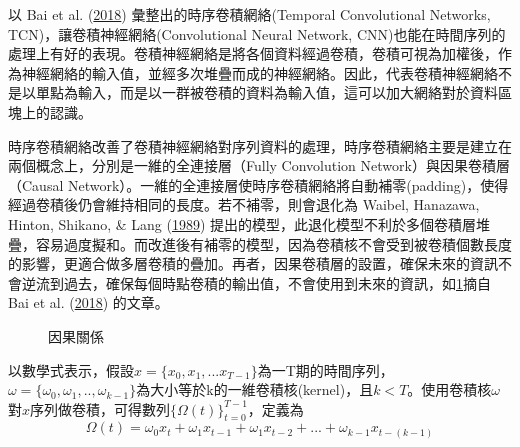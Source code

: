 \documentclass[oneside]{book}
\begin{document}
以 Bai et al. (\protect\hyperlink{ref-baiEmpiricalEvaluationGeneric2018}{2018}) 彙整出的時序卷積網絡(Temporal Convolutional Networks, TCN)，讓卷積神經網絡(Convolutional Neural Network, CNN)也能在時間序列的處理上有好的表現。卷積神經網絡是將各個資料經過卷積，卷積可視為加權後，作為神經網絡的輸入值，並經多次堆疊而成的神經網絡。因此，代表卷積神經網絡不是以單點為輸入，而是以一群被卷積的資料為輸入值，這可以加大網絡對於資料區塊上的認識。

時序卷積網絡改善了卷積神經網絡對序列資料的處理，時序卷積網絡主要是建立在兩個概念上，分別是一維的全連接層（Fully Convolution Network）與因果卷積層（Causal Network）。一維的全連接層使時序卷積網絡將自動補零(padding)，使得經過卷積後仍會維持相同的長度。若不補零，則會退化為 Waibel, Hanazawa, Hinton, Shikano, \& Lang (\protect\hyperlink{ref-waibelPhonemeRecognitionUsing1989}{1989}) 提出的模型，此退化模型不利於多個卷積層堆疊，容易過度擬和。而改進後有補零的模型，因為卷積核不會受到被卷積個數長度的影響，更適合做多層卷積的疊加。再者，因果卷積層的設置，確保未來的資訊不會逆流到過去，確保每個時點卷積的輸出值，不會使用到未來的資訊，如\ref{fig:causal}摘自 Bai et al. (\protect\hyperlink{ref-baiEmpiricalEvaluationGeneric2018}{2018}) 的文章。

\begin{figure}

{\centering {}

}

\caption{因果關係}\label{fig:causal}
\end{figure}

以數學式表示，假設\(x=\{x_0,x_1,...x_{T-1}\}\)為一T期的時間序列，\(\omega = \{\omega_0,\omega_1,..,\omega_{k-1}\}\)為大小等於k的一維卷積核(kernel)，且\(k<T\)。使用卷積核\(\omega\)對\(x\)序列做卷積，可得數列\(\{\Omega(t)\}_{t=0}^{T-1}\)，定義為
\begin{equation} 
   \Omega(t) = \omega_0x_t+\omega_1x_{t-1}+\omega_1x_{t-2}+...+\omega_{k-1}x_{t-(k-1)}
  \label{eq:tcn}
\end{equation}
\end{document}
